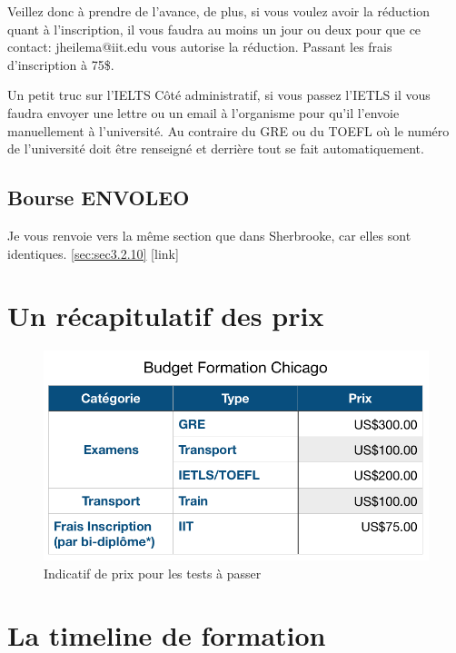 Veillez donc à prendre de l’avance, de plus, si vous voulez avoir la réduction quant à l’inscription, il vous faudra au moins un jour ou deux pour que ce contact: jheilema@iit.edu vous autorise la réduction. Passant les frais d’inscription à 75\$.

\begin{example}{Un petit truc sur l’IELTS}
  Côté administratif, si vous passez l’IETLS il vous faudra envoyer une lettre ou un email à l’organisme pour qu’il l’envoie manuellement à l’université. Au contraire du GRE ou du TOEFL où le numéro de l’université doit être renseigné et derrière tout se fait automatiquement.
\end{example}


\subsection{Bourse ENVOLEO}\label{sec:sec2.3.2}
Je vous renvoie vers la même section que dans Sherbrooke, car elles sont identiques. \ref{sec:sec3.2.10} [link]


\section{Un récapitulatif des prix}\label{sec:sec2.4}

\begin{figure}[h!]
\centering
\includegraphics[width = 120mm]{figures/Budget_Chicago}
\caption{Indicatif de prix pour les tests à passer}
\end{figure}


\section{La timeline de formation}\label{sec:sec2.5}

